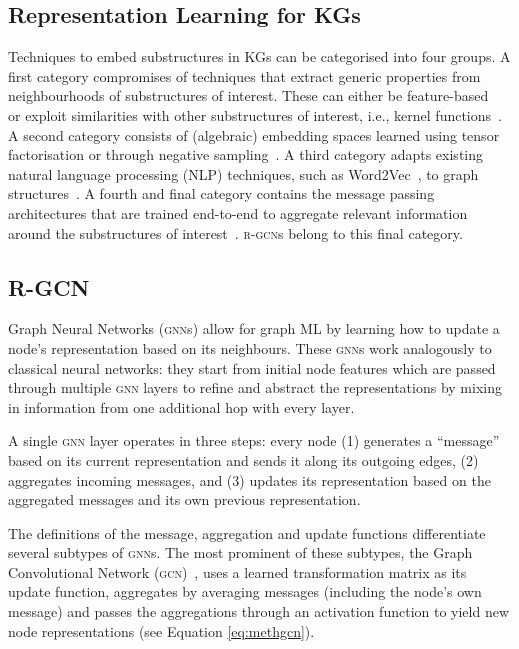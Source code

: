 \documentclass{llncs}
\begin{document}
\subsection{Representation Learning for KGs}
Techniques to embed substructures in KGs can be categorised into four groups. A first category compromises of techniques that extract generic properties from neighbourhoods of substructures of interest. These can either be feature-based~\cite{Steenwinckel2021INK,vandewiele2020mindwalc} or exploit similarities with other substructures of interest, i.e., kernel functions~\cite{de2013fast,vishwanathan2010graph}. A second category consists of (algebraic) embedding spaces learned using tensor factorisation or through negative sampling~\cite{bordes2013translating,kazemi2018simple,yang2015embedding,dettmers2018convolutional,zhang2019quaternion}. A third category adapts existing natural language processing (NLP) techniques, such as Word2Vec~\cite{mikolov2013efficient}, to graph structures~\cite{ristoski2016rdf2vec}. A fourth and final category contains the message passing architectures that are trained end-to-end to aggregate relevant information around the substructures of interest~\cite{schlichtkrull2018modeling,2019transgcn,nathani2019learning,compgcn}. \textsc{r-gcn}s belong to this final category.

\subsection{R-GCN}
Graph Neural Networks (\textsc{gnn}s) allow for graph ML by learning how to update a node's representation based on its neighbours. These \textsc{gnn}s work analogously to classical neural networks: they start from initial node features which are passed through multiple \textsc{gnn} layers to refine and abstract the representations by mixing in information from one additional hop with every layer.

A single \textsc{gnn} layer operates in three steps: every node (1) generates a ``message'' based on its current representation and sends it along its outgoing edges, (2) aggregates incoming messages, and (3) updates its representation based on the aggregated messages and its own previous representation.

The definitions of the message, aggregation and update functions differentiate several subtypes of \textsc{gnn}s. The most prominent of these subtypes, the Graph Convolutional Network (\textsc{gcn})~\cite{kipf2016semi}, uses a learned transformation matrix as its update function, aggregates by averaging messages (including the node's own message) and passes the aggregations through an activation function to yield new node representations (see Equation \ref{eq:methgcn}).
\end{document}
